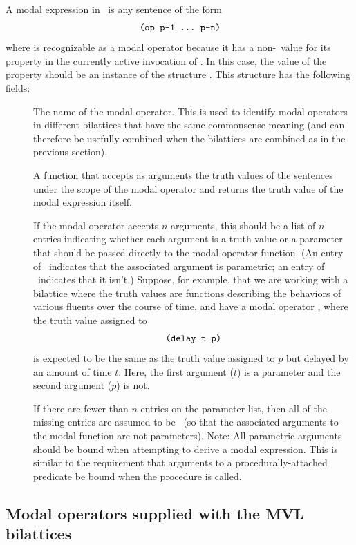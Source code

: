 A modal expression in \mvl\ is any sentence of the form 
 \[\mbox{\tt (op p-1 \dots\ p-n)}\]
 where  is recognizable as a modal operator because it has a
non-\NIL\ value for its  property in the currently
active invocation of \mvl.  In this case, the value of the
 property should be an instance of the structure
.  This structure has the following fields:
 \begin{description}
 \item [] The name of the modal operator.  This is used
to identify modal operators in different bilattices that have the
same commonsense meaning (and can therefore be usefully combined when
the bilattices are combined as in the previous section).
 \item [] A function that accepts as arguments the
truth values of the sentences under the scope of the modal operator
and returns the truth value of the modal expression itself.
 \item [] If the modal operator accepts $n$
arguments, this should be a list of $n$ entries indicating whether
each argument is a truth value or a parameter that should be passed
directly to the modal operator function.  (An entry of \T\ indicates
that the associated argument is parametric; an entry of \NIL\
indicates that it isn't.)  Suppose, for example, that we are working
with a bilattice where the truth values are functions describing the
behaviors of various fluents over the course of time, and have a modal
operator \type{delay}, where the truth value assigned to
 \[\mbox{\tt (delay t p)}\]
 is expected to be the same as the truth value assigned to $p$ but
delayed by an amount of time $t$.  Here, the first argument ($t$) is
a parameter and the second argument ($p$) is not.

If there are fewer than $n$ entries on the parameter list, then all of
the missing entries are assumed to be \NIL\ (so that the associated
arguments to the modal function are not parameters).  Note: All
parametric arguments should be bound when attempting to derive a modal
expression.  This is similar to the requirement that arguments to a
procedurally-attached predicate be bound when the procedure is called.
 \end{description}

\subsection{Modal operators supplied with the MVL bilattices}

